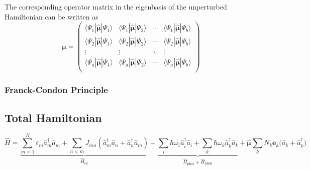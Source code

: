 \documentclass[9pt]{report}
\begin{document}
The corresponding operator matrix in the eigenbasis of the unperturbed Hamiltonian can be written as
\begin{equation}
\renewcommand{\arraystretch}{1.3}
\boldsymbol{\mu}
=
\left(\begin{array}{cccc}
\langle\Psi_{1}|\hat{\boldsymbol{\mu}}|\Psi_{1}\rangle & \langle\Psi_{1}|\hat{\boldsymbol{\mu}}|\Psi_{2}\rangle  &  \cdots  &  \langle\Psi_{1}|\hat{\boldsymbol{\mu}}|\Psi_{b}\rangle
\\
\langle\Psi_{2}|\hat{\boldsymbol{\mu}}|\Psi_{1}\rangle & \langle\Psi_{2}|\hat{\boldsymbol{\mu}}|\Psi_{2}\rangle  &  \cdots  &  \langle\Psi_{2}|\hat{\boldsymbol{\mu}}|\Psi_{b}\rangle
\\
\vdots  &  \vdots  &  \ddots  &  \vdots
\\
\langle\Psi_{a}|\hat{\boldsymbol{\mu}}|\Psi_{1}\rangle  &  \langle\Psi_{a}|\hat{\boldsymbol{\mu}}|\Psi_{2}\rangle  &  \cdots  &  \langle\Psi_{a}|\hat{\boldsymbol{\mu}}|\Psi_{b}\rangle
\\
\end{array}\right)
\end{equation}

\subsubsection{Franck-Condon Principle}












\subsection{Total Hamiltonian}
\begin{equation}
\hat{H} = \underbrace{\sum_{m=1}^{N}\varepsilon_{m}\hat{a}_{m}^{\dagger}\hat{a}_{m}+\sum_{n<m}J_{mn}(\hat{a}_{m}^{\dagger}\hat{a}_{n}+\hat{a}_{n}^{\dagger}\hat{a}_{m})}_{\hat{H}_{\mathrm{ex}}} + \underbrace{\sum_{i}\hbar\omega_{i}\hat{a}_{i}^{\dagger}\hat{a}_{i}+\sum_{k}\hbar\omega_{k}\hat{a}_{k}^{\dagger}\hat{a}_{k}}_{\hat{H}_{\mathrm{phot}}+\hat{H}_{\mathrm{phon}}}+\hat{\boldsymbol{\mu}}\sum_{k}N_{k}\boldsymbol{e}_{k}\big(\hat{a}_{k}+\hat{a}_{k}^{\dagger}\big)
\end{equation}
\end{document}
